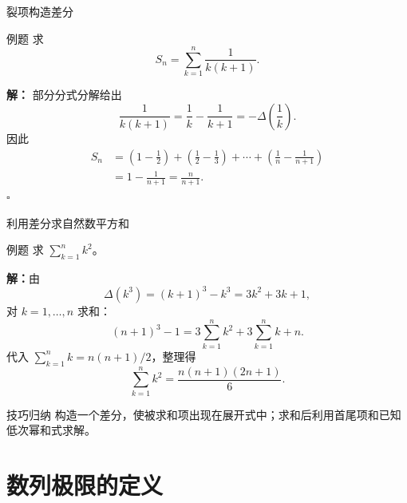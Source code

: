 \documentclass[aspectratio=169,10pt]{ctexbeamer}
\newcommand{\qedhereppt}{\hfill$\square$}
\begin{document}
\begin{frame}{裂项构造差分}
	\footnotesize
	\begin{block}{例题}
		求
		\[
		S_n=\sum_{k=1}^{n}\frac1{k(k+1)}.
		\]
	\end{block}
	\pause
	\textbf{解：}
	部分分式分解给出
	\[
	\frac1{k(k+1)}=\frac1k-\frac1{k+1}=-\Delta\!\left(\frac1k\right).
	\]
	因此
	\begin{align*}
		S_n&=\left(1-\frac12\right)+\left(\frac12-\frac13\right)+\cdots+
		\left(\frac1n-\frac1{n+1}\right)\\
		&=1-\frac1{n+1}=\frac{n}{n+1}.
	\end{align*}
	\qedhereppt
	
\end{frame}



\begin{frame}{利用差分求自然数平方和}
	
	\small
	\begin{block}{例题}
		求 \(\sum_{k=1}^n k^2\)。
	\end{block}
	\pause
	\textbf{解：}由
	\[
	\Delta(k^3)=(k+1)^3-k^3=3k^2+3k+1,
	\]
	对 $k=1,\ldots,n$ 求和：
	\[
	(n+1)^3-1=3\sum_{k=1}^n k^2+3\sum_{k=1}^n k+n.
	\]
	代入 $\sum_{k=1}^n k=n(n+1)/2$，整理得
	\[
	\sum_{k=1}^n k^2=\frac{n(n+1)(2n+1)}6.
	\]
	\begin{alertblock}{技巧归纳}
		构造一个差分，使被求和项出现在展开式中；求和后利用首尾项和已知低次幂和式求解。
	\end{alertblock}
\end{frame}







\section{数列极限的定义}
\end{document}
